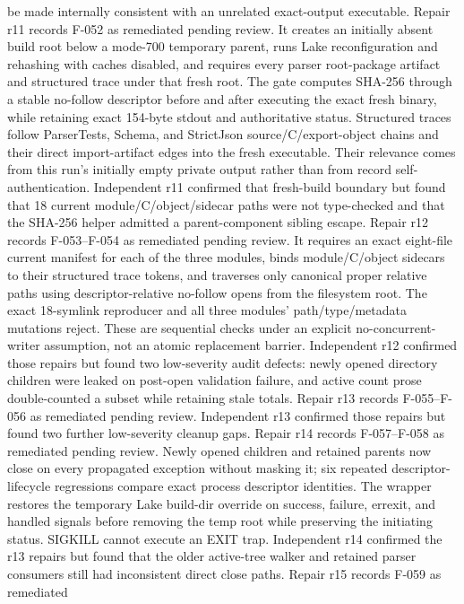 \documentclass[11pt]{article}
\begin{document}
be made internally consistent with an unrelated exact-output executable. Repair r11 records F-052
as remediated pending review. It creates an initially absent build root below a mode-700 temporary
parent, runs Lake reconfiguration and rehashing with caches disabled, and requires every parser
root-package artifact and structured trace under that fresh root. The gate computes SHA-256 through
a stable no-follow descriptor before and after executing the exact fresh binary, while retaining
exact 154-byte stdout and authoritative status. Structured traces follow ParserTests, Schema, and
StrictJson source/C/export-object chains and their direct import-artifact edges into the fresh
executable. Their relevance comes from this run's initially empty private output rather than from
record self-authentication. Independent r11 confirmed that fresh-build boundary but found that 18
current module/C/object/sidecar paths were not type-checked and that the SHA-256 helper admitted a
parent-component sibling escape. Repair r12 records F-053--F-054 as remediated pending review. It
requires an exact eight-file current manifest for each of the three modules, binds module/C/object
sidecars to their structured trace tokens, and traverses only canonical proper relative paths using
descriptor-relative no-follow opens from the filesystem root. The exact 18-symlink reproducer and
all three modules' path/type/metadata mutations reject. These are sequential checks under an
explicit no-concurrent-writer assumption, not an atomic replacement barrier. Independent r12
confirmed those repairs but found two low-severity audit defects: newly opened directory children
were leaked on post-open validation failure, and active count prose double-counted a subset while
retaining stale totals. Repair r13 records F-055--F-056 as remediated pending review. Independent
r13 confirmed those repairs but found two further low-severity cleanup gaps. Repair r14 records
F-057--F-058 as remediated pending review. Newly opened children and retained parents now close on
every propagated exception without masking it; six repeated descriptor-lifecycle regressions
compare exact process descriptor identities. The wrapper restores the temporary Lake build-dir
override on success, failure, errexit, and handled signals before removing the temp root while
preserving the initiating status. SIGKILL cannot execute an EXIT trap. Independent r14 confirmed
the r13 repairs but found that the older active-tree walker and retained
parser consumers still had inconsistent direct close paths. Repair r15 records F-059 as remediated
\end{document}
